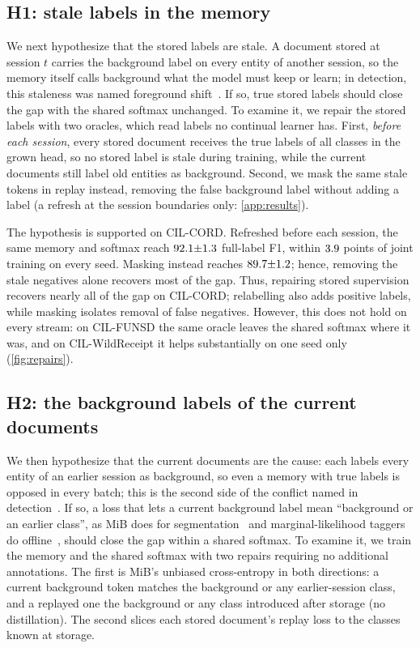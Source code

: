 \documentclass[10pt,twocolumn,letterpaper]{article}
\begin{document}
\subsection{H1: stale labels in the memory}
\label{sec:h1}
We next hypothesize that the stored labels are stale. A document stored at session $t$ carries the background label on every entity of another session, so the memory itself calls background what the model must keep or learn; in detection, this staleness was named foreground shift~\citep{liu2023abr}. If so, true stored labels should close the gap with the shared softmax unchanged. To examine it, we repair the stored labels with two oracles, which read labels no continual learner has. First, \emph{before each session}, every stored document receives the true labels of all classes in the grown head, so no stored label is stale during training, while the current documents still label old entities as background. Second, we mask the same stale tokens in replay instead, removing the false background label without adding a label (a refresh at the session boundaries only: \cref{app:results}).

The hypothesis is supported on CIL-CORD. Refreshed before each session, the same memory and softmax reach $92.1{\pm}1.3$ full-label F1, within $3.9$ points of joint training on every seed. Masking instead reaches $89.7{\pm}1.2$; hence, removing the stale negatives alone recovers most of the gap. Thus, repairing stored supervision recovers nearly all of the gap on CIL-CORD; relabelling also adds positive labels, while masking isolates removal of false negatives. However, this does not hold on every stream: on CIL-FUNSD the same oracle leaves the shared softmax where it was, and on CIL-WildReceipt it helps substantially on one seed only (\cref{fig:repairs}).

\subsection{H2: the background labels of the current documents}
\label{sec:h2}
We then hypothesize that the current documents are the cause: each labels every entity of an earlier session as background, so even a memory with true labels is opposed in every batch; this is the second side of the conflict named in detection~\citep{mo2024bpf}. If so, a loss that lets a current background label mean ``background or an earlier class'', as MiB does for segmentation~\citep{cermelli2020mib} and marginal-likelihood taggers do offline~\citep{greenberg2018marginal}, should close the gap within a shared softmax. To examine it, we train the memory and the shared softmax with two repairs requiring no additional annotations. The first is MiB's unbiased cross-entropy in both directions: a current background token matches the background or any earlier-session class, and a replayed one the background or any class introduced after storage (no distillation). The second slices each stored document's replay loss to the classes known at storage.
\end{document}
